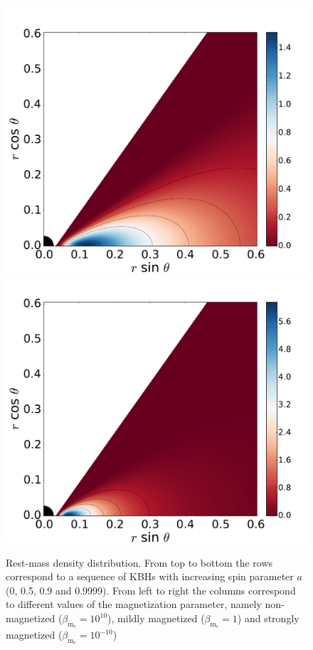 \documentclass[twocolumn,aps,showpacs,showkeys,prd,superscriptaddress,byrevtex, amsmath]{revtex4-1}
\begin{document}
\begin{figure}
\includegraphics[scale=0.14]{figures/fig9_09999_1.pdf}
\hspace{-0.2cm}
\includegraphics[scale=0.14]{figures/fig9_09999__10.pdf}
\hspace{-0.2cm}
\caption{Rest-mass density distribution. From top to bottom the rows correspond to a sequence of KBHs with increasing spin parameter $a$ (0, 0.5, 0.9 and 0.9999). From left to right the columns correspond to different values of the magnetization parameter, namely non-magnetized ($\beta_{\mathrm{m}_{\mathrm{c}}} = 10^{10}$), mildly magnetized ($\beta_{\mathrm{m}_{\mathrm{c}}} = 1$) and strongly magnetized ($\beta_{\mathrm{m}_{\mathrm{c}}} = 10^{-10}$)}
\label{models_Kerr}
\end{figure}
\end{document}
